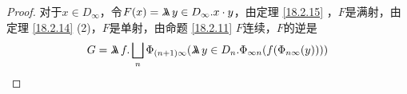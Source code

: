\documentclass[11pt]{article}
\begin{document}
\begin{proof}
对于\(x\in D_\infty\)，令\(F(x)=\metalambda y\in D_\infty.x\cdot y\)，由定理 \ref{18.2.15} ，\(F\)是满射，由定理
\ref{18.2.14} (2)，\(F\)是单射，由命题 \ref{18.2.11} \(F\)连续，\(F\)的逆是
\begin{equation*}
G=\metalambda f.\bigsqcup_n\Phi_{(n+1)\infty}(\metalambda y\in D_n.\Phi_{\infty n}(f(\Phi_{n\infty}(y))))
\end{equation*}
\end{proof}

\nocite{hindley2008lambda}
\nocite{zbMATH03877147}

\label{bibliographystyle link}


\label{bibliography link}

\end{document}
